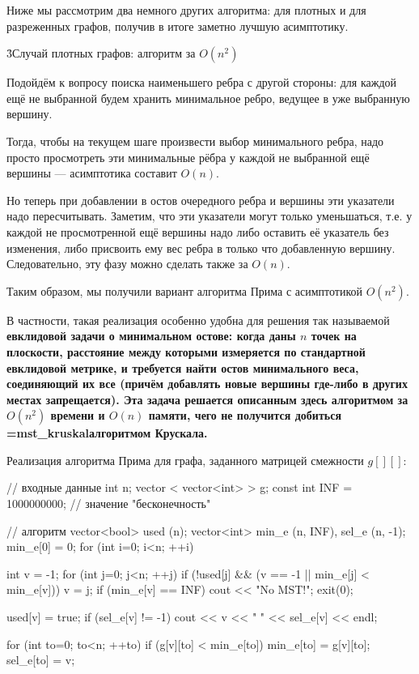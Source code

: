 Ниже мы рассмотрим два немного других алгоритма: для плотных и для разреженных графов, получив в итоге заметно лучшую асимптотику.


\h3{Случай плотных графов: алгоритм за $O(n^2)$}

Подойдём к вопросу поиска наименьшего ребра с другой стороны: для каждой ещё не выбранной будем хранить минимальное ребро, ведущее в уже выбранную вершину.

Тогда, чтобы на текущем шаге произвести выбор минимального ребра, надо просто просмотреть эти минимальные рёбра у каждой не выбранной ещё вершины --- асимптотика составит $O(n)$.

Но теперь при добавлении в остов очередного ребра и вершины эти указатели надо пересчитывать. Заметим, что эти указатели могут только уменьшаться, т.е. у каждой не просмотренной ещё вершины надо либо оставить её указатель без изменения, либо присвоить ему вес ребра в только что добавленную вершину. Следовательно, эту фазу можно сделать также за $O(n)$.

Таким образом, мы получили вариант алгоритма Прима с асимптотикой $O(n^2)$.

В частности, такая реализация особенно удобна для решения так называемой \bf{евклидовой задачи о минимальном остове}: когда даны $n$ точек на плоскости, расстояние между которыми измеряется по стандартной евклидовой метрике, и требуется найти остов минимального веса, соединяющий их все (причём добавлять новые вершины где-либо в других местах запрещается). Эта задача решается описанным здесь алгоритмом за $O(n^2)$ времени и $O(n)$ памяти, чего не получится добиться \algohref=mst_kruskal{алгоритмом Крускала}.

Реализация алгоритма Прима для графа, заданного матрицей смежности $g[][]$:

\code
// входные данные
int n;
vector < vector<int> > g;
const int INF = 1000000000; // значение "бесконечность"

// алгоритм
vector<bool> used (n);
vector<int> min_e (n, INF), sel_e (n, -1);
min_e[0] = 0;
for (int i=0; i<n; ++i) {
	int v = -1;
	for (int j=0; j<n; ++j)
		if (!used[j] && (v == -1 || min_e[j] < min_e[v]))
			v = j;
	if (min_e[v] == INF) {
		cout << "No MST!";
		exit(0);
	}

	used[v] = true;
	if (sel_e[v] != -1)
		cout << v << " " << sel_e[v] << endl;

	for (int to=0; to<n; ++to)
		if (g[v][to] < min_e[to]) {
			min_e[to] = g[v][to];
			sel_e[to] = v;
		}
}
\endcode

